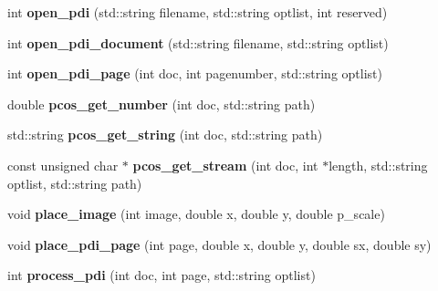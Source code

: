 \begin{DoxyCompactItemize}
\item 
\hypertarget{classPDFlib_a13d36d30ea9a98394589977fe877ae47}{int {\bfseries open\-\_\-pdi} (std\-::string filename, std\-::string optlist, int reserved)}\label{classPDFlib_a13d36d30ea9a98394589977fe877ae47}

\item 
\hypertarget{classPDFlib_a0d18c17852e877905ab0310ecf1e0b37}{int {\bfseries open\-\_\-pdi\-\_\-document} (std\-::string filename, std\-::string optlist)}\label{classPDFlib_a0d18c17852e877905ab0310ecf1e0b37}

\item 
\hypertarget{classPDFlib_ae1e065f5dcb8e50aad847deca22b8841}{int {\bfseries open\-\_\-pdi\-\_\-page} (int doc, int pagenumber, std\-::string optlist)}\label{classPDFlib_ae1e065f5dcb8e50aad847deca22b8841}

\item 
\hypertarget{classPDFlib_a639288411ee0b9e98ffbdb34434f05ed}{double {\bfseries pcos\-\_\-get\-\_\-number} (int doc, std\-::string path)}\label{classPDFlib_a639288411ee0b9e98ffbdb34434f05ed}

\item 
\hypertarget{classPDFlib_a47f5ff4cc553f72a50c7fc3e25aae4aa}{std\-::string {\bfseries pcos\-\_\-get\-\_\-string} (int doc, std\-::string path)}\label{classPDFlib_a47f5ff4cc553f72a50c7fc3e25aae4aa}

\item 
\hypertarget{classPDFlib_a3a6ff19b1fd07bda95745e1f63e731f8}{const unsigned char $\ast$ {\bfseries pcos\-\_\-get\-\_\-stream} (int doc, int $\ast$length, std\-::string optlist, std\-::string path)}\label{classPDFlib_a3a6ff19b1fd07bda95745e1f63e731f8}

\item 
\hypertarget{classPDFlib_a17390ec77d9d1b476870cf72fce905aa}{void {\bfseries place\-\_\-image} (int image, double x, double y, double p\-\_\-scale)}\label{classPDFlib_a17390ec77d9d1b476870cf72fce905aa}

\item 
\hypertarget{classPDFlib_ad56800ffc54122dfde959dbd4b922331}{void {\bfseries place\-\_\-pdi\-\_\-page} (int page, double x, double y, double sx, double sy)}\label{classPDFlib_ad56800ffc54122dfde959dbd4b922331}

\item 
\hypertarget{classPDFlib_a674e04d73bfe7ae771a60114445720a0}{int {\bfseries process\-\_\-pdi} (int doc, int page, std\-::string optlist)}\label{classPDFlib_a674e04d73bfe7ae771a60114445720a0}


\end{DoxyCompactItemize}
